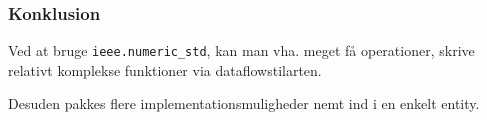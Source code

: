 
\subsubsection{Konklusion}

Ved at bruge \texttt{ieee.numeric\_std}, kan man vha. meget få operationer, skrive relativt komplekse funktioner via dataflowstilarten.

Desuden pakkes flere implementationsmuligheder nemt ind i en enkelt entity.


